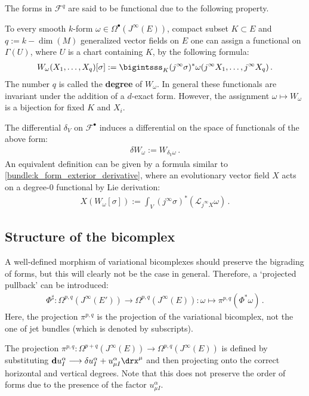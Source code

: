     The forms in $\mathcal{F}^q$ are said to be functional due to the following property.
    \begin{property}[Functionals]\label{var:functionals}
        To every smooth $k$-form $\omega\in\Omega^\bullet(J^\infty(E))$, compact subset $K\subset E$ and $q:=k-\dim(M)$ generalized vector fields on $E$ one can assign a functional on $\Gamma(U)$, where $U$ is a chart containing $K$, by the following formula:
        \begin{gather}
            W_\omega(X_1,\ldots,X_q)[\sigma] := \bigintsss_K(j^\infty\sigma)^*\omega(j^\infty X_1,\ldots,j^\infty X_q)\,.
        \end{gather}
        The number $q$ is called the \textbf{degree} of $W_\omega$. In general these functionals are invariant under the addition of a $d$-exact form. However, the assignment $\omega\mapsto W_\omega$ is a bijection for fixed $K$ and $X_i$.
    \end{property}
    \begin{construct}
        The differential $\delta_V$ on $\mathcal{F}^\bullet$ induces a differential on the space of functionals of the above form:
        \begin{gather}
            \delta W_\omega := W_{\delta_V\omega}\,.
        \end{gather}
        An equivalent definition can be given by a formula similar to \cref{bundle:k_form_exterior_derivative}, where an evolutionary vector field $X$ acts on a degree-$0$ functional by Lie derivation:
        \begin{gather}
            X(W_\omega[\sigma]) := \int_V(j^\infty\sigma)^*(\mathcal{L}_{j^\infty X}\omega)\,.
        \end{gather}
    \end{construct}

\subsection{Structure of the bicomplex}

    A well-defined morphism of variational bicomplexes should preserve the bigrading of forms, but this will clearly not be the case in general. Therefore, a `projected pullback' can be introduced:
    \begin{gather}
        \Phi^\sharp:\Omega^{p,q}(J^\infty(E'))\rightarrow\Omega^{p,q}(J^\infty(E)):\omega\mapsto\pi^{p,q}(\Phi^*\omega)\,.
    \end{gather}
    Here, the projection $\pi^{p,q}$ is the projection of the variational bicomplex, not the one of jet bundles (which is denoted by subscripts).
    \begin{remark}\label{var:degree_raise_remark}
        The projection $\pi^{p,q}:\Omega^{p+q}(J^\infty(E))\rightarrow\Omega^{p,q}(J^\infty(E))$ is defined by substituting $\mathbf{d}u^\alpha_I\longrightarrow\delta u^\alpha_I + u^\alpha_{\mu I}\drx^\mu$ and then projecting onto the correct horizontal and vertical degrees. Note that this does not preserve the order of forms due to the presence of the factor $u^\alpha_{\mu I}$.
    \end{remark}

